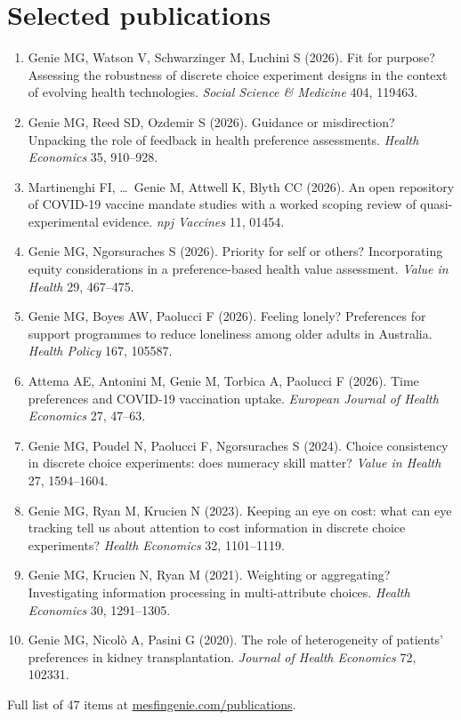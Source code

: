 \documentclass[11pt,a4paper]{article}
\begin{document}
\section*{Selected publications}
\begin{enumerate}[leftmargin=1.1em,itemsep=0.35em,label=\arabic*.]
\item Genie MG, Watson V, Schwarzinger M, Luchini S (2026). Fit for purpose? Assessing the robustness of discrete choice experiment designs in the context of evolving health technologies. \textit{Social Science \& Medicine} 404, 119463.
\item Genie MG, Reed SD, Ozdemir S (2026). Guidance or misdirection? Unpacking the role of feedback in health preference assessments. \textit{Health Economics} 35, 910--928.
\item Martinenghi FI, \ldots\ Genie M, Attwell K, Blyth CC (2026). An open repository of COVID-19 vaccine mandate studies with a worked scoping review of quasi-experimental evidence. \textit{npj Vaccines} 11, 01454.
\item Genie MG, Ngorsuraches S (2026). Priority for self or others? Incorporating equity considerations in a preference-based health value assessment. \textit{Value in Health} 29, 467--475.
\item Genie MG, Boyes AW, Paolucci F (2026). Feeling lonely? Preferences for support programmes to reduce loneliness among older adults in Australia. \textit{Health Policy} 167, 105587.
\item Attema AE, Antonini M, Genie M, Torbica A, Paolucci F (2026). Time preferences and COVID-19 vaccination uptake. \textit{European Journal of Health Economics} 27, 47--63.
\item Genie MG, Poudel N, Paolucci F, Ngorsuraches S (2024). Choice consistency in discrete choice experiments: does numeracy skill matter? \textit{Value in Health} 27, 1594--1604.
\item Genie MG, Ryan M, Krucien N (2023). Keeping an eye on cost: what can eye tracking tell us about attention to cost information in discrete choice experiments? \textit{Health Economics} 32, 1101--1119.
\item Genie MG, Krucien N, Ryan M (2021). Weighting or aggregating? Investigating information processing in multi-attribute choices. \textit{Health Economics} 30, 1291--1305.
\item Genie MG, Nicol\`{o} A, Pasini G (2020). The role of heterogeneity of patients' preferences in kidney transplantation. \textit{Journal of Health Economics} 72, 102331.
\end{enumerate}
\vspace{0.2em}
{\small\color{muted}Full list of 47 items at \href{https://mesfingenie.com/publications/}{mesfingenie.com/publications}.}
\end{document}
